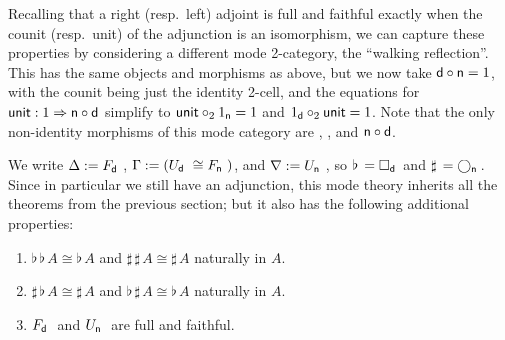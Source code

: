 \documentclass{drl-common/llncs}
\newcommand{\tc}[2]{\ensuremath{#1 \Rightarrow #2}}
\newcommand\compo[2]{\ensuremath{#1 \circ #2}}
\newcommand\comph[2]{\ensuremath{#1 \mathbin{\circ_2} #2}}
\newcommand\F[2]{\ensuremath{F_{#1} \,\, #2}}
\newcommand\U[2]{\ensuremath{U_{#1} \,\, #2}}
\newcommand\Bx[2]{\ensuremath{\Box_{#1} \, {#2}}}
\newcommand\Crc[2]{\ensuremath{\bigcirc_{#1} \, {#2}}}
\newcommand\Flat[1]{\ensuremath{\flat \, {#1}}}
\newcommand\Sharp[1]{\ensuremath{\sharp \, {#1}}}
\newcommand\iso{\cong}
\begin{document}
Recalling that a right (resp.\ left) adjoint is full and faithful
exactly when the counit (resp.\ unit) of the adjunction is an isomorphism,
we can capture these properties by considering a different mode
2-category, the ``walking reflection''. This has the same objects and
morphisms as above, but we now take $\compo{\dsd d}{\dsd n} = 1$, with
the counit being just the identity 2-cell, and the equations for
$\dsd{unit} : \tc {1} {\compo{\dsd n}{\dsd d}}$ simplify to
$\comph{\dsd{unit}}{1_{\dsd n}} = 1$ and $\comph{1_{\dsd d}}{\dsd{unit}}
= 1$.  Note that the only non-identity morphisms of this mode category
are , , and \compo{\dsd{n}}{\dsd{d}}.  

We write $\Delta := \F{\dsd{d}}{}$, $\Gamma := (\U{\dsd d}{} \iso
\F{\dsd n}{})$, and $\nabla := \U{\dsd{n}}{}$, so $\Flat{} =
\Bx{\dsd{d}}{}$ and $\Sharp{} = \Crc{\dsd{n}}{}$.  Since in particular
we still have an adjunction, this mode theory inherits all the theorems
from the previous section; but it also has the following additional
properties:

\begin{theorem}
\begin{enumerate}
\item $\Flat{\Flat A} \iso \Flat A$ and $\Sharp{\Sharp A} \iso \Sharp A$
  naturally in $A$.
\item $\Sharp{\Flat A} \iso \Sharp{A}$ 
and $\Flat{\Sharp A} \iso \Flat{A}$ naturally in $A$.
\item \F{\dsd{d}}{} and \U{\dsd{n}}{} are full and faithful.
\end{enumerate}
\end{theorem}
\end{document}
